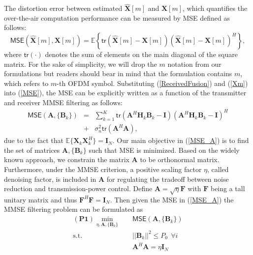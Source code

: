 \documentclass[journal]{IEEEtran}
\theoremstyle{definition}
\begin{document}
 The distortion error between estimated $\mathbf{\hat{X}}[m]$ and $\mathbf{{X}}[m]$, which quantifies the over-the-air computation performance can be measured by MSE defined as follows:
  \begin{equation}
 \label{MSE}
 \mathsf{MSE}(\mathbf{\hat{X}}[m], \mathbf{{X}}[m])\! =\! \mathbb{E}\left\{\mathsf{tr}(\mathbf{\hat{X}}[m]\!-\! \mathbf{{X}}[m])(\mathbf{\hat{X}}[m]\!-\! \mathbf{{X}}[m])^H\right\},
 \end{equation}
 \noindent where $\mathsf{tr}(\cdot)$ denotes the sum of elements on the main diagonal of the square matrix. For the sake of simplicity, we will drop the $m$ notation from our formulations but readers should bear in mind that the formulation contains $m$, which refers to $m$-th OFDM symbol. Substituting (\ref{ReceivedFusion}) and (\ref{Xm}) into (\ref{MSE}), the MSE can be explicitly written as a function of the transmitter and receiver MMSE filtering as follows: \vspace{-0.0cm}
   \begin{eqnarray}
 \label{MSE_A}
 \mathsf{MSE}(\mathbf{{A}}, \{\mathbf{B}_k\})\! \!&=&\! \!\sum_{k =1}^K \mathsf{tr}(\mathbf{A}^H \mathbf{H}_k \mathbf{B}_k - \mathbf{I}  )(\mathbf{A}^H \mathbf{H}_k \mathbf{B}_k - \mathbf{I} )^H \nonumber \\
 &+& \sigma_n^2 \mathsf{tr}(\mathbf{A}^H \mathbf{A} ),
 \end{eqnarray}\vspace{-0.0cm}
 due to the fact that $\mathbb{E} \{\mathbf{X}_k \mathbf{X}_k^H\} =\mathbf{I}_N$. Our main objective in (\ref{MSE_A}) is to find the set of matrices $\mathbf{{A}}, \{\mathbf{B}_k\}$ such that MSE is minimized. Based on the widely known approach, we constrain the matrix $\mathbf{A}$ to be orthonormal matrix. Furthermore, under the MMSE criterion, a positive scaling factor $\eta$, called denoising factor, is included in $\mathbf{A}$ for regulating the tradeoff between noise reduction and transmission-power control. Define $\mathbf{A} = \sqrt{\eta} \mathbf{F}$ with $\mathbf{F}$ being a tall unitary matrix and thus $\mathbf{F}^H\mathbf{F} = \mathbf{I}_N$. Then given the MSE in (\ref{MSE_A}) the MMSE filtering problem can be formulated as \vspace{-0.0cm}
\begin{equation}
\begin{aligned}
(\textbf{P1}) \min_{\eta, \mathbf{{A}}, \{\mathbf{B}_k\}} \quad & \mathsf{MSE}(\mathbf{{A}}, \{\mathbf{B}_k\})\\
\textrm{s.t.} \quad & ||\mathbf{B}_k ||^2 \leq P_0 \: \: \forall i\\
&\mathbf{A}^H \mathbf{A} = \eta \mathbf{I}_N    \\
\end{aligned}
\end{equation}\vspace{-0.0cm}
\end{document}
